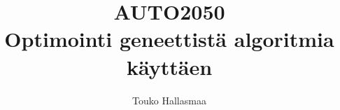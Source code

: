 \documentclass[12pt]{article}
\title{\normalsize\uppercase{auto2050}\\\Huge Optimointi geneettistä algoritmia käyttäen}
\author{Touko Hallasmaa}
\date{}
\begin{document}
\maketitle
\tableofcontents
\pagebreak







% 
% 
\end{document}
